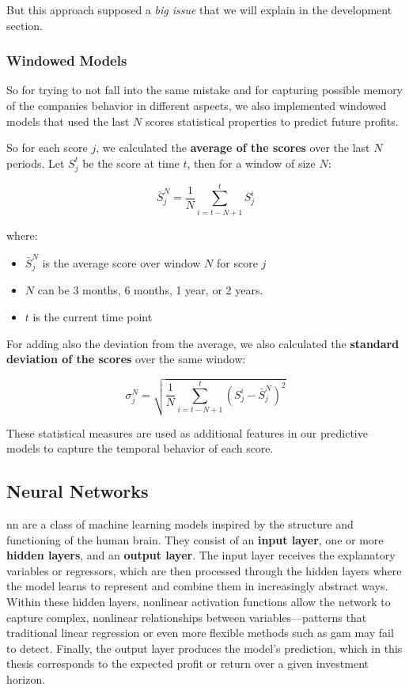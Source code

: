 \documentclass[11pt,english,a4paper,hidelinks]{book}
\begin{document}
\noindent But this approach supposed a \textit{big issue} that we will explain in the development section.

\subsubsection{Windowed Models}
So for trying to not fall into the same mistake and for capturing possible memory of the companies behavior in different aspects, we also implemented windowed models that used the last \(N\) scores statistical properties to predict future profits.

\vspace{0.5cm}
\noindent So for each score \(j\), we calculated the \textbf{average of the scores} over the last \(N\) periods. Let \(S_j^t\) be the score at time \(t\), then for a window of size \(N\):

\begin{equation}
    \bar{S}_j^N = \frac{1}{N} \sum_{i=t-N+1}^{t} S_j^i
\end{equation}

\noindent where:
\begin{itemize}
    \item \(\bar{S}_j^N\) is the average score over window \(N\) for score \(j\)
    \item \(N\) can be 3 months, 6 months, 1 year, or 2 years.
    \item \(t\) is the current time point
\end{itemize}

\noindent For adding also the deviation from the average, we also calculated the \textbf{standard deviation of the scores} over the same window:

\begin{equation}
    \sigma_j^N = \sqrt{\frac{1}{N} \sum_{i=t-N+1}^{t} (S_j^i - \bar{S}_j^N)^2}
\end{equation}

\noindent These statistical measures are used as additional features in our predictive models to capture the temporal behavior of each score.

\subsection{Neural Networks}
\acrshort{nn} are a class of machine learning models inspired by the structure and functioning of the human brain. They consist of an \textbf{input layer}, one or more \textbf{hidden layers}, and an \textbf{output layer}. The input layer receives the explanatory variables or regressors, which are then processed through the hidden layers where the model learns to represent and combine them in increasingly abstract ways. Within these hidden layers, nonlinear activation functions allow the network to capture complex, nonlinear relationships between variables—patterns that traditional linear regression or even more flexible methods such as \acrshort{gam} may fail to detect. Finally, the output layer produces the model’s prediction, which in this thesis corresponds to the expected profit or return over a given investment horizon.
\end{document}
